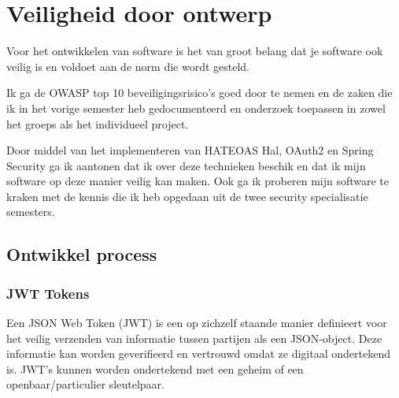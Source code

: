 \newpage
\section{Veiligheid door ontwerp}\label{sec:veiligheid-door-ontwerp}

Voor het ontwikkelen van software is het van groot belang dat je software ook veilig is en voldoet aan de norm die
wordt gesteld.

Ik ga de OWASP top 10 beveiligingsrisico's goed door te nemen en de zaken die ik in het vorige semester heb
gedocumenteerd en onderzoek toepassen in zowel het groeps als het individueel project.

Door middel van het implementeren van HATEOAS Hal, OAuth2 en Spring Security ga ik aantonen dat ik over deze
technieken beschik en dat ik mijn software op deze manier veilig kan maken.
Ook ga ik proberen mijn software te kraken met de kennis die ik heb opgedaan uit de twee security specialisatie
semesters.


\subsection{Ontwikkel process}
\subsubsection{JWT Tokens}
Een JSON Web Token (JWT) is een op zichzelf staande manier definieert voor het veilig verzenden van informatie tussen partijen als een JSON-object.
Deze informatie kan worden geverifieerd en vertrouwd omdat ze digitaal ondertekend is.
JWT's kunnen worden ondertekend met een geheim of een openbaar/particulier sleutelpaar.
